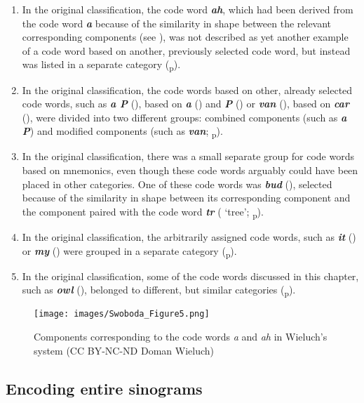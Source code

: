 \documentclass[output=paper,colorlinks,citecolor=brown,arabicfont,chinesefont]{langscibook}
\begin{document}
\begin{enumerate}
    \item In the original classification, the code word \textbf{\emph{ah}}, which had been derived from the code word \textbf{\emph{a}} because of the similarity in shape between the relevant corresponding components (see ), was not described as yet another example of a code word based on another, previously selected code word, but instead was listed in a separate category (\citealt[4]{Wieluch1936}\textsubscript{p}).
    \item In the original classification, the code words based on other, already selected code words, such as \textbf{\emph{a P}} ({}), based on \textbf{\emph{a}} ({}) and \textbf{\emph{P}} ({}) or \textbf{\emph{van}} ({}), based on \textbf{\emph{car}} ({}), were divided into two different groups: combined components (such as \textbf{\emph{a P}}) and modified components (such as \textbf{\emph{van}}; \citealt[4-9]{Wieluch1936}\textsubscript{p}).
    \item In the original classification, there was a small separate group for code words based on mnemonics, even though these code words arguably could have been placed in other categories. One of these code words was \textbf{\emph{bud}} ({}), selected because of the similarity in shape between its corresponding component and the component paired with the code word \textbf{\emph{tr}} ({} ‘tree’; \citealt[8-9]{Wieluch1936}\textsubscript{p}).
    \item In the original classification, the arbitrarily assigned code words, such as \textbf{\emph{it}} ({}) or \textbf{\emph{my}} ({}) were grouped in a separate category (\citealt[9]{Wieluch1936}\textsubscript{p}).
    \item In the original classification, some of the code words discussed in this chapter, such as \textbf{\emph{owl}} ({}), belonged to different, but similar categories (\citealt[4-9]{Wieluch1936}\textsubscript{p}).
\end{enumerate}

\begin{figure}
\texttt{[image: images/Swoboda\_Figure5.png]}
\caption{Components corresponding to the code words \textit{a} and \textit{ah} in Wieluch's system (CC BY-NC-ND Doman Wieluch)}
\label{swoboda:fig5}
\end{figure}

\subsection{Encoding entire sinograms}
\end{document}
